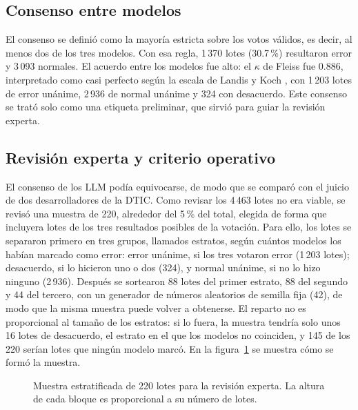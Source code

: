 \subsection{Consenso entre modelos}\label{subsec:met_kappa}

El consenso se definió como la mayoría estricta sobre los votos válidos, es decir, al menos dos de los tres modelos. Con esa regla, 1\,370 lotes (30.7\,\%) resultaron error y 3\,093 normales. El acuerdo entre los modelos fue alto: el $\kappa$ de Fleiss \cite{fleiss1971_kappa} fue 0.886, interpretado como casi perfecto según la escala de Landis y Koch \cite{landis1977_kappa}, con 1\,203 lotes de error unánime, 2\,936 de normal unánime y 324 con desacuerdo. Este consenso se trató solo como una etiqueta preliminar, que sirvió para guiar la revisión experta.

\subsection{Revisión experta y criterio operativo}\label{subsec:met_expertos}\label{sec:met_criterio}

El consenso de los LLM podía equivocarse, de modo que se comparó con el juicio de dos desarrolladores de la DTIC. Como revisar los 4\,463 lotes no era viable, se revisó una muestra de 220, alrededor del 5\,\% del total, elegida de forma que incluyera lotes de los tres resultados posibles de la votación. Para ello, los lotes se separaron primero en tres grupos, llamados estratos, según cuántos modelos los habían marcado como error: error unánime, si los tres votaron error (1\,203 lotes); desacuerdo, si lo hicieron uno o dos (324), y normal unánime, si no lo hizo ninguno (2\,936). Después se sortearon 88 lotes del primer estrato, 88 del segundo y 44 del tercero, con un generador de números aleatorios de semilla fija (42), de modo que la misma muestra puede volver a obtenerse. El reparto no es proporcional al tamaño de los estratos: si lo fuera, la muestra tendría solo unos 16 lotes de desacuerdo, el estrato en el que los modelos no coinciden, y 145 de los 220 serían lotes que ningún modelo marcó. En la figura~\ref{fig:met_muestra} se muestra cómo se formó la muestra.

\begin{figure}[H]
\centering

\caption{Muestra estratificada de 220 lotes para la revisión experta. La altura de cada bloque es proporcional a su número de lotes.}
\label{fig:met_muestra}
\end{figure}

